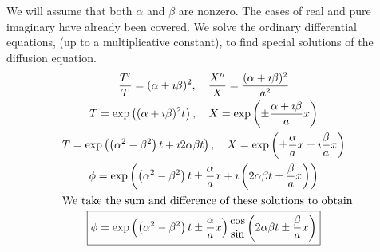 {%
\begin{Solution}
  \label{solution separation pt=a2pxx}
  We will assume that both $\alpha$ and $\beta$ are nonzero.  The cases
  of real and pure imaginary have already been covered.
  We solve the ordinary differential equations, (up to a multiplicative
  constant), to find special solutions of the diffusion equation.
  \begin{gather*}
    \frac{T'}{T} = (\alpha + \imath \beta)^2, \quad
    \frac{X''}{X} = \frac{(\alpha + \imath \beta)^2}{a^2} \\
    T = \exp \left( (\alpha + \imath \beta)^2 t \right), \quad
    X = \exp \left( \pm \frac{\alpha + \imath \beta}{a} x \right) \\
    T = \exp \left( \left(\alpha^2 - \beta^2 \right) t 
      + \imath 2 \alpha \beta t \right), \quad
    X = \exp \left( \pm \frac{\alpha}{a} x  
      \pm \imath \frac{\beta}{a} x \right) \\
    \phi = \exp \left( \left(\alpha^2 - \beta^2 \right) t \pm \frac{\alpha}{a} x 
      + \imath \left( 2 \alpha \beta t \pm \frac{\beta}{a} x \right) \right) \\
    \intertext{We take the sum and difference of these solutions to obtain}
    \boxed{
      \phi = \exp \left( \left(\alpha^2 - \beta^2 \right) t 
        \pm \frac{\alpha}{a} x \right)
      \begin{matrix} \cos \\ \sin \end{matrix}
      \left( 2 \alpha \beta t \pm \frac{\beta}{a} x \right)
      }
  \end{gather*}
\end{Solution}




\raggedbottom
}
